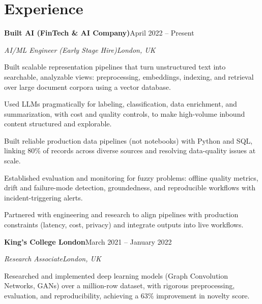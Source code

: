 \documentclass[10pt,a4paper]{article}
\newcommand{\entry}[4]{%
  {\color{company}\bfseries #1}\hfill {\color{muted}#2}\par
  \vspace{1pt}
  {\itshape #3}\hfill {\color{muted}\itshape #4}\par
  \vspace{3pt}%
}
\begin{document}
\section{Experience}
\entry{Built AI (FinTech \& AI Company)}{April 2022 -- Present}{AI/ML Engineer (Early Stage Hire)}{London, UK}
\begin{tight}
  \item Built scalable representation pipelines that turn unstructured text into searchable, analyzable views: preprocessing, embeddings, indexing, and retrieval over large document corpora using a vector database.
  \item Used LLMs pragmatically for labeling, classification, data enrichment, and summarization, with cost and quality controls, to make high-volume inbound content structured and explorable.
  \item Built reliable production data pipelines (not notebooks) with Python and SQL, linking 80\% of records across diverse sources and resolving data-quality issues at scale.
  \item Established evaluation and monitoring for fuzzy problems: offline quality metrics, drift and failure-mode detection, groundedness, and reproducible workflows with incident-triggering alerts.
  \item Partnered with engineering and research to align pipelines with production constraints (latency, cost, privacy) and integrate outputs into live workflows.
\end{tight}

\entry{King's College London}{March 2021 -- January 2022}{Research Associate}{London, UK}
\begin{tight}
  \item Researched and implemented deep learning models (Graph Convolution Networks, GANs) over a million-row dataset, with rigorous preprocessing, evaluation, and reproducibility, achieving a 63\% improvement in novelty score.
\end{tight}

\end{document}
